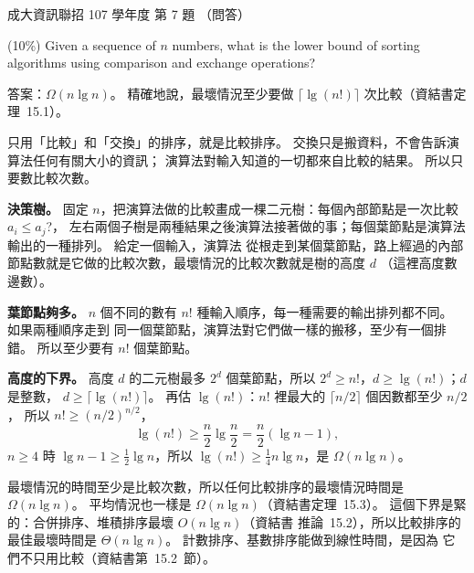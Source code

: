 \begin{pastexam}[label={px:ncku-107-prog-07}]{成大資訊聯招 107 學年度 第 7 題}
（問答）

(10\%) Given a sequence of $n$ numbers, what is the lower bound of sorting algorithms using
comparison and exchange operations?
\end{pastexam}

\begin{pastsoln}
答案：$\Omega(n \lg n)$。 精確地說，最壞情況至少要做 $\lceil \lg(n!) \rceil$ 次比較（資結書定理~15.1）。

只用「比較」和「交換」的排序，就是比較排序。 交換只是搬資料，不會告訴演算法任何有關大小的資訊；
演算法對輸入知道的一切都來自比較的結果。 所以只要數比較次數。

\textbf{決策樹。} 固定 $n$，把演算法做的比較畫成一棵二元樹：每個內部節點是一次比較 $a_i \le a_j$?，
左右兩個子樹是兩種結果之後演算法接著做的事；每個葉節點是演算法輸出的一種排列。 給定一個輸入，演算法
從根走到某個葉節點，路上經過的內部節點數就是它做的比較次數，最壞情況的比較次數就是樹的高度 $d$
（這裡高度數邊數）。

\textbf{葉節點夠多。} $n$ 個不同的數有 $n!$ 種輸入順序，每一種需要的輸出排列都不同。 如果兩種順序走到
同一個葉節點，演算法對它們做一樣的搬移，至少有一個排錯。 所以至少要有 $n!$ 個葉節點。

\textbf{高度的下界。} 高度 $d$ 的二元樹最多 $2^d$ 個葉節點，所以 $2^d \ge n!$，$d \ge \lg(n!)$；$d$ 是整數，
$d \ge \lceil \lg(n!) \rceil$。 再估 $\lg(n!)$：$n!$ 裡最大的 $\lceil n/2 \rceil$ 個因數都至少 $n/2$，
所以 $n! \ge (n/2)^{n/2}$，
\[
\lg(n!) \ge \frac{n}{2} \lg \frac{n}{2} = \frac{n}{2}(\lg n - 1) ,
\]
$n \ge 4$ 時 $\lg n - 1 \ge \frac{1}{2} \lg n$，所以 $\lg(n!) \ge \frac{1}{4} n \lg n$，是
$\Omega(n \lg n)$。

最壞情況的時間至少是比較次數，所以任何比較排序的最壞情況時間是 $\Omega(n \lg n)$。 平均情況也一樣是
$\Omega(n \lg n)$（資結書定理~15.3）。 這個下界是緊的：合併排序、堆積排序最壞 $O(n \lg n)$（資結書
推論~15.2），所以比較排序的最佳最壞時間是 $\Theta(n \lg n)$。 計數排序、基數排序能做到線性時間，是因為
它們不只用比較（資結書第~15.2~節）。
\end{pastsoln}
